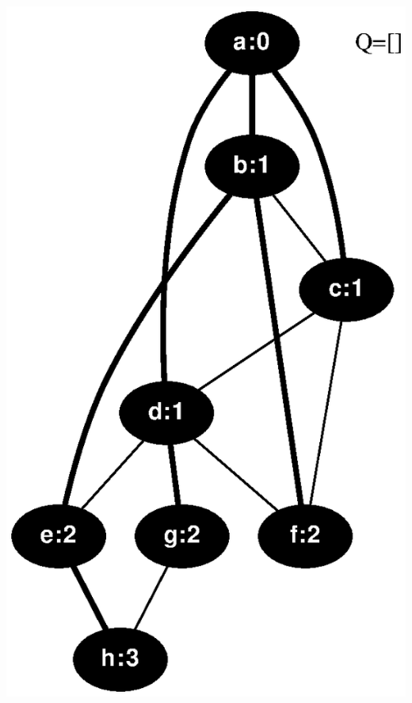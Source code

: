 \documentclass{article}
\begin{document}
\includegraphics[height=.3\textheight]{bfs_undirected_classroom_key_08.eps}
\vspace{1em}
\end{document}

